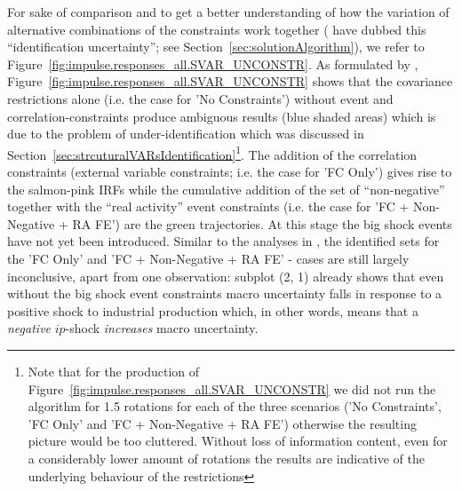\documentclass[a4paper,11pt,listof=nochaptergap,oneside,pointednumbers,bibtotoc,bigheadings,liststotoc,hidelinks]{scrbook}
\theoremstyle{mysatz}
\theoremstyle{mydefinition}
\theoremstyle{mytheorem}
\theoremstyle{mybemerkung}
\begin{document}
For sake of comparison and to get a better understanding of how the variation of alternative combinations of the constraints work together (\citet{ludvigsonetal:19} have dubbed this ``identification uncertainty''; see Section~\ref{sec:solutionAlgorithm}), we refer to Figure~\ref{fig:impulse.responses_all.SVAR_UNCONSTR}. As formulated by \citet{ludvigsonetal:19}, Figure~\ref{fig:impulse.responses_all.SVAR_UNCONSTR} shows that the covariance restrictions alone (i.e. the case for 'No Constraints') without event and correlation-constraints produce ambiguous results (blue shaded areas) which is due to the problem of under-identification which was discussed in Section~\ref{sec:strcuturalVARsIdentification}\footnote{Note that for the production of Figure~\ref{fig:impulse.responses_all.SVAR_UNCONSTR} we did not run the algorithm for 1.5 rotations for each of the three scenarios ('No Constraints', 'FC Only' and 'FC + Non-Negative + RA FE') otherwise the resulting picture would be too cluttered. Without loss of information content, even for a considerably lower amount of rotations the results are indicative of the underlying behaviour of the restrictions}. The addition of the correlation constraints (external variable constraints; i.e. the case for 'FC Only') gives rise to the salmon-pink IRFs while the cumulative addition of the set of ``non-negative'' together with the ``real activity'' event constraints (i.e. the case for 'FC + Non-Negative + RA FE') are the green trajectories. At this stage the big shock events have not yet been introduced. Similar to the analyses in \citet{ludvigsonetal:19}, the identified sets for the 'FC Only' and 'FC + Non-Negative + RA FE' - cases are still largely inconclusive, apart from one observation: subplot (2, 1) already shows that even without the big shock event constraints macro uncertainty falls in response to a positive shock to industrial production which, in other words, means that a \textit{negative} $ip$-shock \textit{increases} macro uncertainty. 
\end{document}
